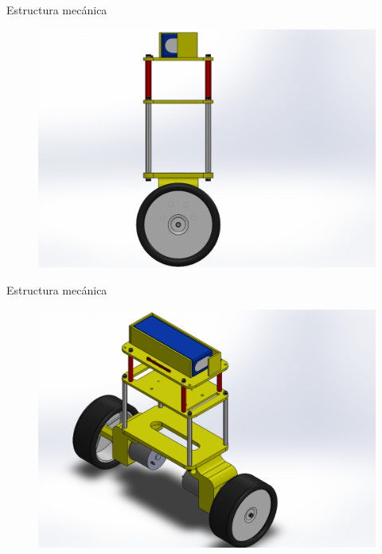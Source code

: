 \documentclass{beamer}
\begin{document}
\begin{frame}{Estructura mecánica}
\begin{center}
	\begin{figure}[H]
		\center
		\includegraphics[trim = 5cm 0mm 10cm 0mm,clip, angle=0, scale = 0.35]{imagenes/Balancing_Robot/EnsanBalanceLateral.PDF}
	\end{figure}
\end{center}
\end{frame}

\begin{frame}{Estructura mecánica}
\begin{center}
	\begin{figure}[H]
		\center
		\includegraphics[trim = 2cm 0mm 8cm 0mm,clip, angle=0, scale = 0.35]{imagenes/Balancing_Robot/EnsanBalanceCab.PDF}
	\end{figure}
\end{center}
\end{frame}
\end{document}
